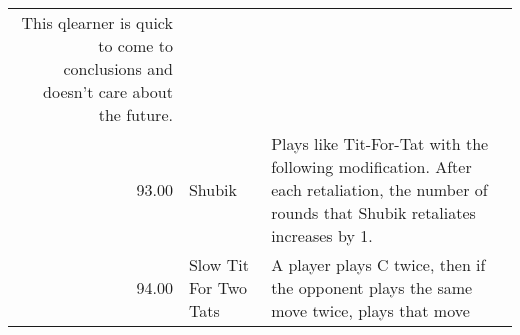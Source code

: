 \begin{table}[!hbtp]
\begin{adjustbox}{width=2\textwidth, angle=90}
\begin{tabular}{rll}
	This qlearner is quick to come to conclusions and doesn't care about the future.                                                                                                                                                                                                                                                                                                                                                                                                                                                                                                                                                                                                                                                                                                                                                                                                                                                          \\
	93.00  & Shubik                      & Plays like Tit-For-Tat with the following modification. After
	each retaliation, the number of rounds that Shubik retaliates
	increases by 1.                                                                                                                                                                                                                                                                                                                                                                                                                                                                                                                                                                                                                                                                                                                                                                                                                                                                      \\
	94.00  & Slow Tit For Two Tats       & A player plays C twice, then if the opponent plays the same move twice,
	plays that move                                                                                                                                                                                                                                                                                                                                                                                                                                                                                                                                                                                                                                                                                                                                                                                                                                                                                                                             \\

\end{tabular}
\end{adjustbox}
\end{table}
